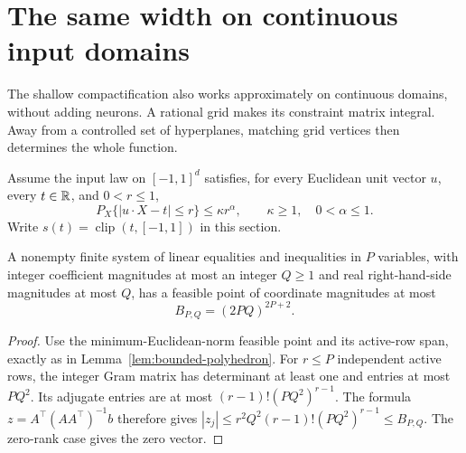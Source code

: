 \section{The same width on continuous input domains}
\label{sec:shallow-continuous-grid}
The shallow compactification also works approximately on continuous domains, without adding neurons. A rational grid makes its constraint matrix integral. Away from a controlled set of hyperplanes, matching grid vertices then determines the whole function.

Assume the input law on $[-1,1]^d$ satisfies, for every Euclidean unit vector $u$, every $t\in\mathbb R$, and $0<r\le1$,
\begin{equation}
 P_X\{|u\cdot X-t|\le r\}\le\kappa r^\alpha,
 \qquad \kappa\ge1,\quad 0<\alpha\le1.
 \label{eq:shallow-grid-slab}
\end{equation}
Write $s(t)=\operatorname{clip}(t,[-1,1])$ in this section.

\begin{lemma}
\label{lem:grid-polyhedron}
A nonempty finite system of linear equalities and inequalities in $P$ variables, with integer coefficient magnitudes at most an integer $Q\ge1$ and real right-hand-side magnitudes at most $Q$, has a feasible point of coordinate magnitudes at most
\[
 B_{P,Q}=(2PQ)^{2P+2}.
\]
\end{lemma}
\begin{proof}
Use the minimum-Euclidean-norm feasible point and its active-row span, exactly as in Lemma~\ref{lem:bounded-polyhedron}. For $r\le P$ independent active rows, the integer Gram matrix has determinant at least one and entries at most $PQ^2$. Its adjugate entries are at most $(r-1)!(PQ^2)^{r-1}$. The formula $z=A^\top(AA^\top)^{-1}b$ therefore gives
$|z_j|\le r^2Q^2(r-1)!(PQ^2)^{r-1}\le B_{P,Q}$.
The zero-rank case gives the zero vector.
\end{proof}

